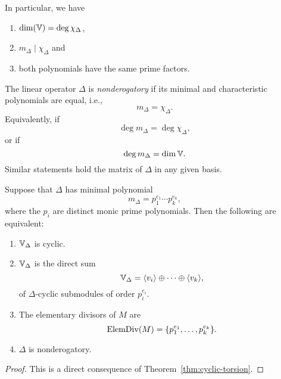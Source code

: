 \begin{rem}\label{rem:minimal-characteristic}
    In particular, we have
    \begin{enumerate}[-]
        \item $\dim(\mathbb V)=\deg\chi_\Delta$,
        
        \item $m_\Delta\mid\chi_\Delta$ and
        
        \item both polynomials have the same prime factors.
    \end{enumerate}
\end{rem}

\begin{defn}
    The linear operator $\Delta$ is \textsl{nonderogatory} if its minimal and characteristic polynomials are equal, i.e.,
    $$
        m_\Delta = \chi_\Delta.
    $$
    Equivalently, if
    $$
        \deg m_\Delta = \deg \chi_\Delta,
    $$
    or if
    $$
        \deg m_\Delta = \dim\mathbb V.
    $$
    Similar statements hold the matrix of $\Delta$ in any given basis.
\end{defn}

\begin{thm}\label{thm:Delta-cyclic-equivalences}
    Suppose that\/ $\Delta$ has minimal polynomial  
    $$
        m_\Delta = p_1^{e_1}\cdots p_k^{e_k},
    $$  
    where the\/ $p_i$ are distinct monic prime polynomials. Then the following are equivalent:  
    \begin{enumerate}[\rm a)]
        \item $\mathbb V_\Delta$ is cyclic.  
        
        \item $\mathbb V_\Delta$ is the direct sum  
        $$
            \mathbb V_\Delta = \langle v_i\rangle\oplus\cdots\oplus\langle v_k\rangle,
        $$  
        of\/ $\Delta$-cyclic submodules of order\/ $p_i^{e_i}$.  
        
        \item The elementary divisors of\/ $M$ are  
        $$
            \operatorname{ElemDiv}(M) = \{p_1^{e_1},
                \dots,p_k^{e_k}\}.
        $$  
        \item $\Delta$ is nonderogatory.  
    \end{enumerate}
\end{thm}

\begin{proof}
    This is a direct consequence of Theorem~\ref{thm:cyclic-torsion}.
\end{proof}

